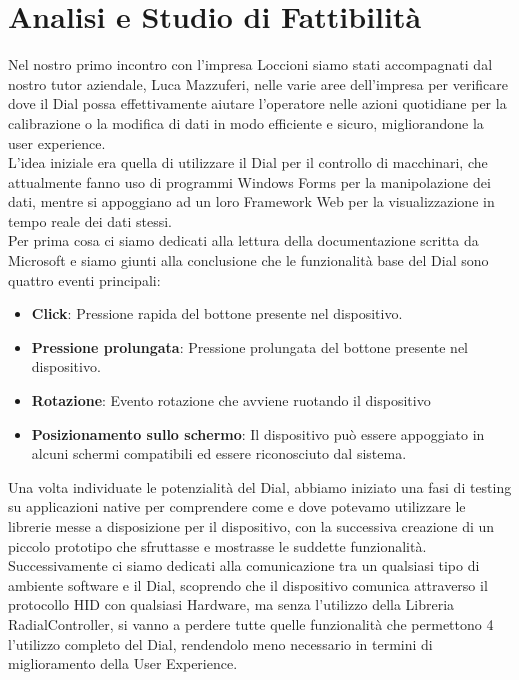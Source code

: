 \chapter{Analisi e Studio di Fattibilità}
\label{chap:analisi}

Nel nostro primo incontro con l'impresa Loccioni siamo stati accompagnati dal nostro tutor aziendale, Luca Mazzuferi, nelle varie aree dell'impresa per verificare dove il Dial possa effettivamente aiutare l'operatore nelle azioni quotidiane per la calibrazione o la modifica di dati in modo efficiente e sicuro, migliorandone la user experience.\\

L'idea iniziale era quella di utilizzare il Dial per il controllo di macchinari, che attualmente fanno uso di programmi Windows Forms per la manipolazione dei dati, mentre si appoggiano ad un loro Framework Web per la visualizzazione in tempo reale dei dati stessi.\\

Per prima cosa ci siamo dedicati alla lettura della documentazione scritta da Microsoft e siamo giunti alla conclusione che le funzionalità base del Dial sono quattro eventi principali:

\begin{itemize}
\item \textbf{Click}: Pressione rapida del bottone presente nel dispositivo.
\item \textbf{Pressione prolungata}: Pressione prolungata del bottone presente nel dispositivo.
\item \textbf{Rotazione}: Evento rotazione che avviene ruotando il dispositivo
\item \textbf{Posizionamento sullo schermo}: Il dispositivo può essere appoggiato in alcuni schermi compatibili ed essere riconosciuto dal sistema.
\end{itemize}

Una volta individuate le potenzialità del Dial, abbiamo iniziato una fasi di testing su applicazioni native per comprendere come e dove potevamo utilizzare le librerie messe a disposizione per il dispositivo, con la successiva creazione di un piccolo prototipo che sfruttasse e mostrasse le suddette funzionalità.\\

Successivamente ci siamo dedicati alla comunicazione tra un qualsiasi tipo di ambiente software e il Dial, scoprendo che il dispositivo comunica attraverso il protocollo HID con qualsiasi Hardware, ma senza l'utilizzo della Libreria RadialController, si vanno a perdere tutte quelle funzionalità che permettono 4 l'utilizzo completo del Dial, rendendolo meno necessario in termini di miglioramento della User Experience.
 
